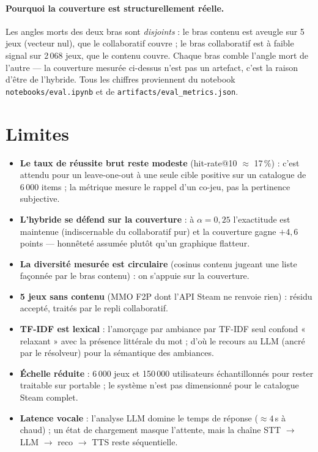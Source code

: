 \documentclass[11pt,a4paper]{article}
\begin{document}
\paragraph{Pourquoi la couverture est structurellement réelle.} Les angles morts
des deux bras sont \emph{disjoints} : le bras contenu est aveugle sur 5 jeux
(vecteur nul), que le collaboratif couvre ; le bras collaboratif est à faible
signal sur 2\,068 jeux, que le contenu couvre. Chaque bras comble l'angle mort de
l'autre — la couverture mesurée ci-dessus n'est pas un artefact, c'est la raison
d'être de l'hybride. Tous les chiffres proviennent du notebook
\texttt{notebooks/eval.ipynb} et de \texttt{artifacts/eval\_metrics.json}.

\section{Limites}

\begin{itemize}
  \item \textbf{Le taux de réussite brut reste modeste} (hit-rate@10 $\approx$
        17\,\%) : c'est attendu pour un leave-one-out à une seule cible positive
        sur un catalogue de 6\,000 items ; la métrique mesure le rappel d'un
        co-jeu, pas la pertinence subjective.
  \item \textbf{L'hybride se défend sur la couverture} : à $\alpha=0{,}25$
        l'exactitude est maintenue (indiscernable du collaboratif pur) et la
        couverture gagne $+4{,}6$ points — honnêteté assumée plutôt qu'un
        graphique flatteur.
  \item \textbf{La diversité mesurée est circulaire} (cosinus contenu jugeant une
        liste façonnée par le bras contenu) : on s'appuie sur la couverture.
  \item \textbf{5 jeux sans contenu} (MMO F2P dont l'API Steam ne renvoie rien) :
        résidu accepté, traités par le repli collaboratif.
  \item \textbf{TF-IDF est lexical} : l'amorçage par ambiance par TF-IDF seul
        confond « relaxant » avec la présence littérale du mot ; d'où le recours
        au LLM (ancré par le résolveur) pour la sémantique des ambiances.
  \item \textbf{Échelle réduite} : 6\,000 jeux et 150\,000 utilisateurs
        échantillonnés pour rester traitable sur portable ; le système n'est pas
        dimensionné pour le catalogue Steam complet.
  \item \textbf{Latence vocale} : l'analyse LLM domine le temps de réponse
        ($\approx 4$\,s à chaud) ; un état de chargement masque l'attente, mais
        la chaîne STT $\rightarrow$ LLM $\rightarrow$ reco $\rightarrow$ TTS reste
        séquentielle.
\end{itemize}
\end{document}
